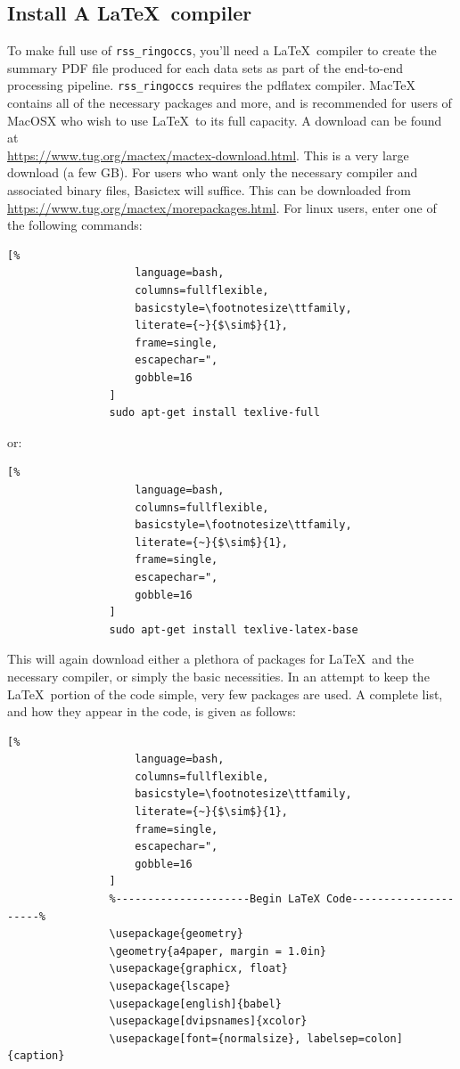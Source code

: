 \documentclass[titlepage, 12pt]{article}
\begin{document}
        \subsection{Install A \LaTeX\ compiler}
            To make full use of \texttt{rss\_ringoccs}, you'll need a
            \LaTeX\ compiler to create the summary PDF file produced
            for each data sets as part of the end-to-end processing pipeline. 
            \texttt{rss\_ringoccs} requires the pdflatex compiler. 
            MacTeX contains all of the necessary
            packages and more, and is recommended for users of MacOSX
            who wish to use \LaTeX\ to its full capacity. A download
            can be found at\\
            \url{https://www.tug.org/mactex/mactex-download.html}.
            This is a very large download (a few
            GB). For users who want only the necessary
            compiler and associated binary files,
            Basictex will suffice. This can be downloaded from
            \url{https://www.tug.org/mactex/morepackages.html}.
            For linux users, enter one of the following commands:
            \begin{lstlisting}[%
                    language=bash,
                    columns=fullflexible,
                    basicstyle=\footnotesize\ttfamily,
                    literate={~}{$\sim$}{1},
                    frame=single,
                    escapechar=",
                    gobble=16
                ]
                sudo apt-get install texlive-full
            \end{lstlisting}
            or:
            \begin{lstlisting}[%
                    language=bash,
                    columns=fullflexible,
                    basicstyle=\footnotesize\ttfamily,
                    literate={~}{$\sim$}{1},
                    frame=single,
                    escapechar=",
                    gobble=16
                ]
                sudo apt-get install texlive-latex-base
            \end{lstlisting}
            This will again download either a plethora of packages for
            \LaTeX\ and the necessary compiler, or simply the basic necessities.
            In an attempt to keep the \LaTeX\ portion of the code simple,
            very few packages are used. A complete list, and how they appear
            in the code, is given as follows:
            \begin{lstlisting}[%
                    language=bash,
                    columns=fullflexible,
                    basicstyle=\footnotesize\ttfamily,
                    literate={~}{$\sim$}{1},
                    frame=single,
                    escapechar=",
                    gobble=16
                ]
                %---------------------Begin LaTeX Code---------------------%
                \usepackage{geometry}
                \geometry{a4paper, margin = 1.0in}
                \usepackage{graphicx, float}
                \usepackage{lscape}
                \usepackage[english]{babel}
                \usepackage[dvipsnames]{xcolor}
                \usepackage[font={normalsize}, labelsep=colon]{caption}
            \end{lstlisting}
\end{document}

